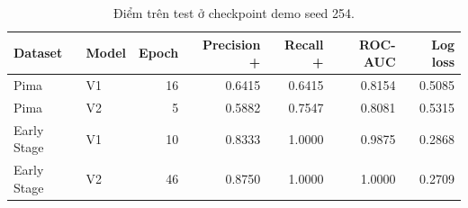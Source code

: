 \par\FloatBarrier\begin{table}[H]\centering\small{}\setlength{\tabcolsep}{5pt}
\caption{Điểm trên test ở checkpoint demo seed 254.}\begin{tabular}{llrrrrr}\toprule
Dataset & Model & Epoch & Precision + & Recall + & ROC-AUC & Log loss\\\midrule
Pima & V1 & 16 & 0.6415 & 0.6415 & 0.8154 & 0.5085\\
Pima & V2 & 5 & 0.5882 & 0.7547 & 0.8081 & 0.5315\\
Early Stage & V1 & 10 & 0.8333 & 1.0000 & 0.9875 & 0.2868\\
Early Stage & V2 & 46 & 0.8750 & 1.0000 & 1.0000 & 0.2709\\\bottomrule\end{tabular}\end{table}
